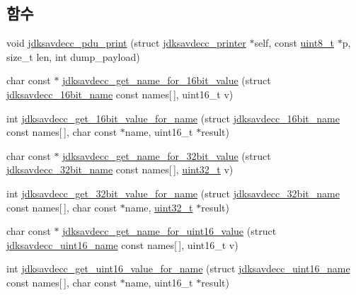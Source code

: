 \subsection*{함수}
\begin{DoxyCompactItemize}
\item 
void \hyperlink{group__util_ga9482974a9f186a0efe0140d4b1c6e5fa}{jdksavdecc\+\_\+pdu\+\_\+print} (struct \hyperlink{structjdksavdecc__printer}{jdksavdecc\+\_\+printer} $\ast$self, const \hyperlink{stdint_8h_aba7bc1797add20fe3efdf37ced1182c5}{uint8\+\_\+t} $\ast$p, size\+\_\+t len, int dump\+\_\+payload)
\item 
char const $\ast$ \hyperlink{group__util_gaab0f3349c8f837864bf8e479060be9a9}{jdksavdecc\+\_\+get\+\_\+name\+\_\+for\+\_\+16bit\+\_\+value} (struct \hyperlink{structjdksavdecc__16bit__name}{jdksavdecc\+\_\+16bit\+\_\+name} const names\mbox{[}$\,$\mbox{]}, uint16\+\_\+t v)
\item 
int \hyperlink{group__util_ga24ea24c6632d9c0a71d129bc562edb5f}{jdksavdecc\+\_\+get\+\_\+16bit\+\_\+value\+\_\+for\+\_\+name} (struct \hyperlink{structjdksavdecc__16bit__name}{jdksavdecc\+\_\+16bit\+\_\+name} const names\mbox{[}$\,$\mbox{]}, char const $\ast$name, uint16\+\_\+t $\ast$result)
\item 
char const $\ast$ \hyperlink{group__util_ga9510cc670f6b041fc780ade706184218}{jdksavdecc\+\_\+get\+\_\+name\+\_\+for\+\_\+32bit\+\_\+value} (struct \hyperlink{structjdksavdecc__32bit__name}{jdksavdecc\+\_\+32bit\+\_\+name} const names\mbox{[}$\,$\mbox{]}, \hyperlink{parse_8c_a6eb1e68cc391dd753bc8ce896dbb8315}{uint32\+\_\+t} v)
\item 
int \hyperlink{group__util_ga9400db8f4b9705fc98d8d71321c5da71}{jdksavdecc\+\_\+get\+\_\+32bit\+\_\+value\+\_\+for\+\_\+name} (struct \hyperlink{structjdksavdecc__32bit__name}{jdksavdecc\+\_\+32bit\+\_\+name} const names\mbox{[}$\,$\mbox{]}, char const $\ast$name, \hyperlink{parse_8c_a6eb1e68cc391dd753bc8ce896dbb8315}{uint32\+\_\+t} $\ast$result)
\item 
char const $\ast$ \hyperlink{group__util_ga57128fd5b5fe236fb5158d51cef2bf96}{jdksavdecc\+\_\+get\+\_\+name\+\_\+for\+\_\+uint16\+\_\+value} (struct \hyperlink{structjdksavdecc__uint16__name}{jdksavdecc\+\_\+uint16\+\_\+name} const names\mbox{[}$\,$\mbox{]}, uint16\+\_\+t v)
\item 
int \hyperlink{group__util_ga6ce025c560a3d14a9519d4d4f150b462}{jdksavdecc\+\_\+get\+\_\+uint16\+\_\+value\+\_\+for\+\_\+name} (struct \hyperlink{structjdksavdecc__uint16__name}{jdksavdecc\+\_\+uint16\+\_\+name} const names\mbox{[}$\,$\mbox{]}, char const $\ast$name, uint16\+\_\+t $\ast$result)

\end{DoxyCompactItemize}
